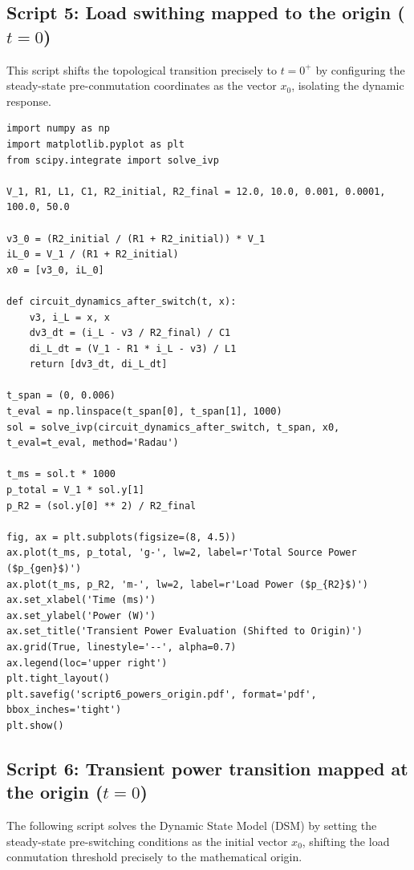 \documentclass[energies,accept,oneauthor,pdftex]{Definitions/mdpi}
\begin{document}
\subsection*{Script 5: Load swithing mapped to the origin ($t=0$)}
This script shifts the topological transition precisely to $t=0^+$ by configuring the steady-state pre-conmutation coordinates as the vector $x_0$, isolating the dynamic response.

{\footnotesize
\begin{verbatim}
import numpy as np
import matplotlib.pyplot as plt
from scipy.integrate import solve_ivp

V_1, R1, L1, C1, R2_initial, R2_final = 12.0, 10.0, 0.001, 0.0001, 100.0, 50.0

v3_0 = (R2_initial / (R1 + R2_initial)) * V_1
iL_0 = V_1 / (R1 + R2_initial)
x0 = [v3_0, iL_0]

def circuit_dynamics_after_switch(t, x):
    v3, i_L = x, x
    dv3_dt = (i_L - v3 / R2_final) / C1
    di_L_dt = (V_1 - R1 * i_L - v3) / L1
    return [dv3_dt, di_L_dt]

t_span = (0, 0.006)
t_eval = np.linspace(t_span[0], t_span[1], 1000)
sol = solve_ivp(circuit_dynamics_after_switch, t_span, x0, t_eval=t_eval, method='Radau')

t_ms = sol.t * 1000
p_total = V_1 * sol.y[1]
p_R2 = (sol.y[0] ** 2) / R2_final

fig, ax = plt.subplots(figsize=(8, 4.5))
ax.plot(t_ms, p_total, 'g-', lw=2, label=r'Total Source Power ($p_{gen}$)')
ax.plot(t_ms, p_R2, 'm-', lw=2, label=r'Load Power ($p_{R2}$)')
ax.set_xlabel('Time (ms)')
ax.set_ylabel('Power (W)')
ax.set_title('Transient Power Evaluation (Shifted to Origin)')
ax.grid(True, linestyle='--', alpha=0.7)
ax.legend(loc='upper right')
plt.tight_layout()
plt.savefig('script6_powers_origin.pdf', format='pdf', bbox_inches='tight')
plt.show()
\end{verbatim}
}


\subsection*{Script 6: Transient power transition mapped at the origin ($t=0$)}
The following script solves the Dynamic State Model (DSM) by setting the steady-state pre-switching conditions as the initial vector $x_0$, shifting the load conmutation threshold precisely to the mathematical origin.
\end{document}
